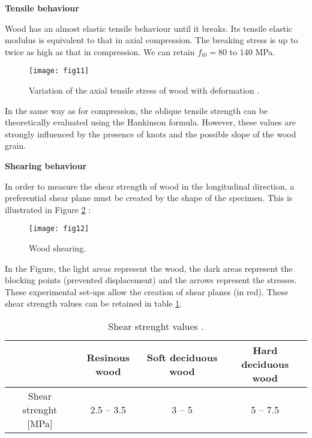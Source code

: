 \textbf{Tensile behaviour}

Wood has an almost elastic tensile behaviour until it breaks. Its tensile elastic modulus is equivalent to that in axial compression. The breaking stress is up to twice as high as that in compression. We can retain $f_{t0}=80$ to 140 MPa.


\begin{figure}[htp]
	\centering
	\texttt{[image: fig11]}
	\caption{Variation of the axial tensile stress of wood with deformation \citep{Taazount2021}.}
	\label{fig:galaxy}
\end{figure}

In the same way as for compression, the oblique tensile strength can be theoretically evaluated using the Hankinson formula. However, these values are strongly influenced by the presence of knots and the possible slope of the wood grain.

\smallskip

\textbf{Shearing behaviour}

In order to measure the shear strength of wood in the longitudinal direction, a preferential shear plane must be created by the shape of the specimen. This is illustrated in Figure \ref{fig:fig12} :


\begin{figure}[htp]
	\centering
	\texttt{[image: fig12]}
	\caption{Wood shearing.}
	\label{fig:fig12}
\end{figure}

In the Figure, the light areas represent the wood, the dark areas represent the blocking points (prevented displacement) and the arrows represent the stresses. These experimental set-ups allow the creation of shear planes (in red). These shear strength values can be retained in table \ref{fig:fig13}.

\begin{table} [H]
\centering
\begin{tabular}{cccc}
	\toprule %
	& Resinous wood & Soft deciduous wood & Hard deciduous wood \\\midrule
Shear strenght [\unit{\mega\pascal}] & 2.5 -- 3.5
	& 3 -- 5 & 5 -- 7.5 \\
	  \bottomrule %
\end{tabular}
	\caption{Shear strenght values \citep{Taazount2021}.}
	\label{fig:fig13}
\end{table}

%


